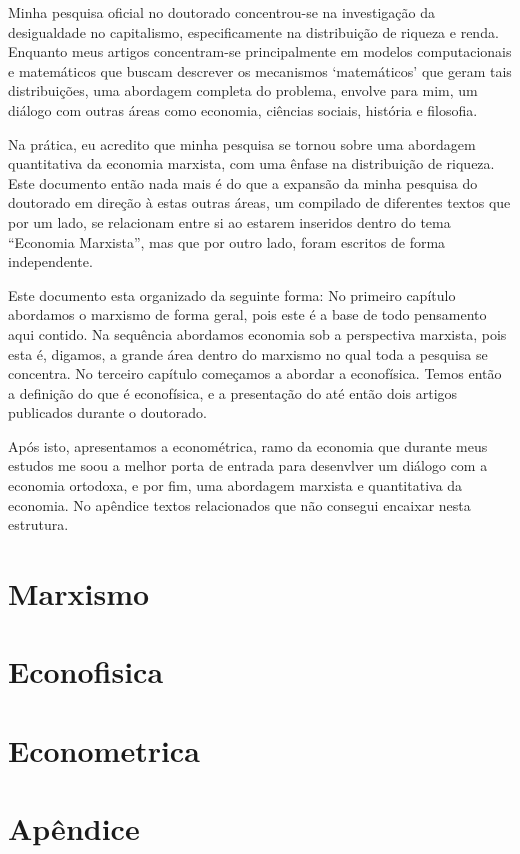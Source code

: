 \documentclass{article}
\begin{document}
Minha pesquisa oficial no doutorado concentrou-se na investigação da desigualdade no capitalismo, especificamente na distribuição de riqueza e renda. Enquanto meus artigos concentram-se principalmente em modelos computacionais e matemáticos que buscam descrever os mecanismos `matemáticos' que geram tais distribuições, uma abordagem completa do problema, envolve para mim, um diálogo com outras áreas como economia, ciências sociais, história e filosofia.

Na prática, eu acredito que minha pesquisa se tornou sobre uma abordagem quantitativa da economia marxista, com uma ênfase na distribuição de riqueza. Este documento então nada mais é do que a expansão da minha pesquisa do doutorado em direção à estas outras áreas, um compilado de diferentes textos que por um lado, se relacionam entre si ao estarem inseridos dentro do tema ``Economia Marxista'', mas que por outro lado, foram escritos de forma independente.

Este documento esta organizado da seguinte forma: No primeiro capítulo abordamos o marxismo de forma geral, pois este é a base de todo pensamento aqui contido.  Na sequência abordamos economia  sob a perspectiva marxista, pois esta é, digamos, a grande área dentro do marxismo no qual toda a pesquisa se concentra. No terceiro capítulo começamos a abordar a econofísica. Temos então a definição do que é econofísica, e a presentação do até então dois artigos publicados durante o doutorado.

Após isto, apresentamos a econométrica, ramo da economia que durante meus estudos me soou a melhor porta de entrada para desenvlver um diálogo com a economia ortodoxa, e por fim, uma abordagem marxista e quantitativa da economia. No apêndice textos relacionados que não consegui encaixar nesta estrutura.


\newpage
\part{Marxismo}





\part{Econofisica}





\part{Econometrica} 

\appendix
\part{Apêndice}



\end{document}
